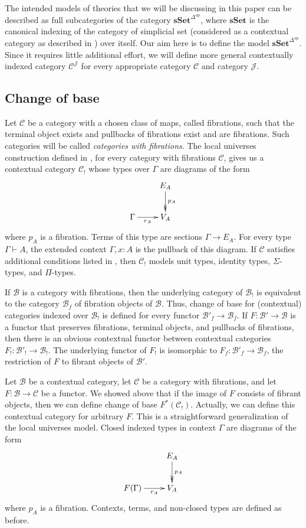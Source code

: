 \documentclass[reqno]{amsart}
\theoremstyle{definition}
\theoremstyle{remark}
\newcommand{\fs}[1]{\mathrm{#1}}
\newcommand{\cat}[1]{\mathbf{#1}}
\newcommand{\scat}[1]{\mathcal{#1}}
\newcommand{\sSet}{\cat{sSet}}
\numberwithin{figure}{section}
\begin{document}
The intended models of theories that we will be discussing in this paper can be described as full subcategories of the category $\sSet^{\Delta^\fs{op}}$,
where $\sSet$ is the canonical indexing of the category of simplicial set (considered as a contextual category as described in \cite{kap-lum-voe}) over itself.
Our aim here is to define the model $\sSet^{\Delta^\fs{op}}$.
Since it requires little additional effort, we will define more general contextually indexed category $\scat{C}^\scat{J}$ for every appropriate category $\scat{C}$ and category $\scat{J}$.

\subsection{Change of base}

Let $\scat{C}$ be a category with a chosen class of maps, called fibrations, such that the terminal object exists and pullbacks of fibrations exist and are fibrations.
Such categories will be called \emph{categories with fibrations}.
The local universes construction defined in \cite{local-universes}, for every category with fibrations $\scat{C}$,
gives us a contextual category $\scat{C}_!$ whose types over $\Gamma$ are diagrams of the form
\[ \xymatrix{                       & E_A \ar@{->>}[d]^{p_A} \\
              \Gamma \ar[r]_-{r_A}  & V_A
            } \]
where $p_A$ is a fibration.
Terms of this type are sections $\Gamma \to E_A$.
For every type $\Gamma \vdash A$, the extended context $\Gamma, x : A$ is the pullback of this diagram.
If $\scat{C}$ satisfies additional conditions listed in \cite[Definition~4.2.1]{local-universes}, then $\scat{C}_!$ models unit types, identity types, $\Sigma$-types, and $\Pi$-types.

If $\scat{B}$ is a category with fibrations, then the underlying category of $\scat{B}_!$ is equivalent to the category $\scat{B}_f$ of fibration objects of $\scat{B}$.
Thus, change of base for (contextual) categories indexed over $\scat{B}_!$ is defined for every functor $\scat{B}'_f \to \scat{B}_f$.
If $F : \scat{B}' \to \scat{B}$ is a functor that preserves fibrations, terminal objects, and pullbacks of fibrations, then there is an obvious contextual functor between contextual categories $F_! : \scat{B}'_! \to \scat{B}_!$.
The underlying functor of $F_!$ is isomorphic to $F_f : \scat{B}'_f \to \scat{B}_f$, the restriction of $F$ to fibrant objects of $\scat{B}'$.

Let $\scat{B}$ be a contextual category, let $\scat{C}$ be a category with fibrations, and let $F : \scat{B} \to \scat{C}$ be a functor.
We showed above that if the image of $F$ consists of fibrant objects, then we can define change of base $F^*(\scat{C}_!)$.
Actually, we can define this contextual category for arbitrary $F$.
This is a straightforward generalization of the local universes model.
Closed indexed types in context $\Gamma$ are diagrams of the form
\[ \xymatrix{                           & E_A \ar@{->>}[d]^{p_A} \\
              F(\Gamma) \ar[r]_-{r_A}   & V_A
            } \]
where $p_A$ is a fibration.
Contexts, terms, and non-closed types are defined as before.
\end{document}
